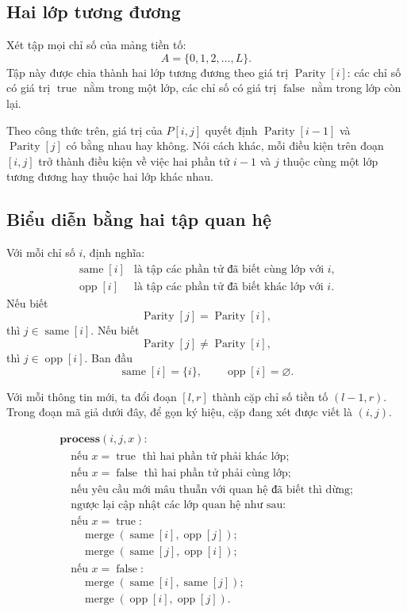 \documentclass[11pt]{article}
\begin{document}
\subsection{Hai lớp tương đương}

Xét tập mọi chỉ số của mảng tiền tố:
\[
  A=\{0,1,2,\ldots,L\}.
\]
Tập này được chia thành hai lớp tương đương theo giá trị
\(\operatorname{Parity}[i]\): các chỉ số có giá trị \(\operatorname{true}\)
nằm trong một lớp, các chỉ số có giá trị \(\operatorname{false}\) nằm trong
lớp còn lại.

Theo công thức trên, giá trị của \(P[i,j]\) quyết định
\(\operatorname{Parity}[i-1]\) và \(\operatorname{Parity}[j]\) có bằng nhau
hay không. Nói cách khác, mỗi điều kiện trên đoạn \([i,j]\) trở thành điều
kiện về việc hai phần tử \(i-1\) và \(j\) thuộc cùng một lớp tương đương hay
thuộc hai lớp khác nhau.

\subsection{Biểu diễn bằng hai tập quan hệ}

Với mỗi chỉ số \(i\), định nghĩa:
\[
\begin{array}{ll}
\operatorname{same}[i] & \text{là tập các phần tử đã biết cùng lớp với } i,\\
\operatorname{opp}[i] & \text{là tập các phần tử đã biết khác lớp với } i.
\end{array}
\]
Nếu biết
\[
  \operatorname{Parity}[j]=\operatorname{Parity}[i],
\]
thì \(j\in \operatorname{same}[i]\). Nếu biết
\[
  \operatorname{Parity}[j]\ne\operatorname{Parity}[i],
\]
thì \(j\in \operatorname{opp}[i]\). Ban đầu
\[
  \operatorname{same}[i]=\{i\},\qquad \operatorname{opp}[i]=\varnothing.
\]

Với mỗi thông tin mới, ta đổi đoạn \([l,r]\) thành cặp chỉ số tiền tố
\((l-1,r)\). Trong đoạn mã giả dưới đây, để gọn ký hiệu, cặp đang xét được
viết là \((i,j)\).

\[
\begin{array}{l}
\textbf{process}(i,j,x):\\
\quad \text{nếu } x=\operatorname{true} \text{ thì hai phần tử phải khác lớp;}\\
\quad \text{nếu } x=\operatorname{false} \text{ thì hai phần tử phải cùng lớp;}\\
\quad \text{nếu yêu cầu mới mâu thuẫn với quan hệ đã biết thì dừng;}\\
\quad \text{ngược lại cập nhật các lớp quan hệ như sau:}\\[0.3em]
\quad \text{nếu } x=\operatorname{true}:\\
\qquad \operatorname{merge}(\operatorname{same}[i],\operatorname{opp}[j]);\\
\qquad \operatorname{merge}(\operatorname{same}[j],\operatorname{opp}[i]);\\
\quad \text{nếu } x=\operatorname{false}:\\
\qquad \operatorname{merge}(\operatorname{same}[i],\operatorname{same}[j]);\\
\qquad \operatorname{merge}(\operatorname{opp}[i],\operatorname{opp}[j]).
\end{array}
\]
\end{document}

